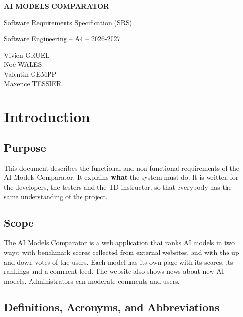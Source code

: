\documentclass[11pt,a4paper]{article}
\newcommand{\product}{AI Models Comparator}
\newcommand{\team}{Vivien GRUEL \\ Noé WALES \\ Valentin GEMPP \\ Maxence TESSIER}
\begin{document}
\begin{titlepage}
  \centering
  \vspace*{4cm}
  {\Huge\bfseries \MakeUppercase{\product}\par}
  \vspace{1.5cm}
  {\LARGE Software Requirements Specification (SRS)\par}
  \vspace{4cm}
  {\large Software Engineering -- A4 -- 2026-2027\par}
  \vspace{1cm}
  {\large \team\par}
  \vfill
\end{titlepage}

\tableofcontents
\newpage

\section{Introduction}

\subsection{Purpose}

This document describes the functional and non-functional requirements of the \product{}. It explains \textbf{what} the system must do. It is written for the developers, the testers and the TD instructor, so that everybody has the same understanding of the project.

\subsection{Scope}

The \product{} is a web application that ranks AI models in two ways: with benchmark scores collected from external websites, and with the up and down votes of the users. Each model has its own page with its scores, its rankings and a comment feed. The website also shows news about new AI models. Administrators can moderate comments and users.

\subsection{Definitions, Acronyms, and Abbreviations}
\end{document}
